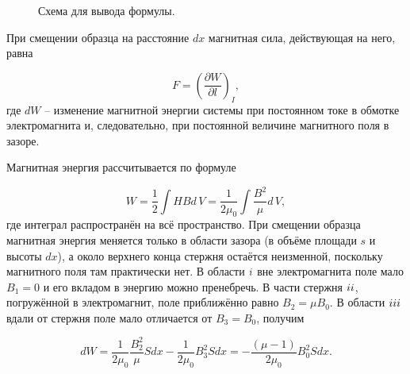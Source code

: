 \documentclass[a4paper, 12pt]{article}%
\newcommand{\RomanNumeralCaps}[1]{\uppercase\expandafter{\romannumeral#1}}
\begin{document}
	\begin{figure}[h]
		\caption{Схема для вывода формулы.}
	\end{figure}
	
	При смещении образца на расстояние $ dx $ магнитная сила, действующая на него, равна
	
	\begin{equation}\label{1}
		F = \left(\frac{\partial W}{\partial l}\right)_I,
	\end{equation}
	где $ dW $ -- изменение магнитной энергии системы при постоянном токе
	в обмотке электромагнита и, следовательно, при постоянной величине
	магнитного поля в зазоре.
	
	Магнитная энергия рассчитывается по формуле
	
	\begin{equation}\label{2}
		W=\frac{1}{2}\int HBd\,V = \frac{1}{2\mu_0}\int\frac{B^2}{\mu}d\,V,
	\end{equation}
	где интеграл распространён на всё пространство. При смещении образца магнитная энергия меняется только в области зазора (в объёме площади $ s $ и высоты $ dx $), а около верхнего конца стержня остаётся неизменной, поскольку магнитного поля там практически нет. В области $\RomanNumeralCaps{1}$ вне электромагнита поле мало
	$B_1 = 0$ и его вкладом в энергию можно пренебречь.
	В части стержня $\RomanNumeralCaps{2}$, погружённой в электромагнит,
	поле приближённо равно $B_2 = \mu B_0$. В области $\RomanNumeralCaps{3}$
	вдали от стержня поле мало отличается от $B_3 = B_0$, получим
	
	\begin{equation}\label{3}
	dW=\frac{1}{2\mu_0}\frac{B^2_2}{\mu}Sdx - \frac{1}{2\mu_0}B^2_3 Sdx = -\frac{(\mu - 1)}{2\mu_0}B^2_0Sdx.
	\end{equation}
	
\end{document}

